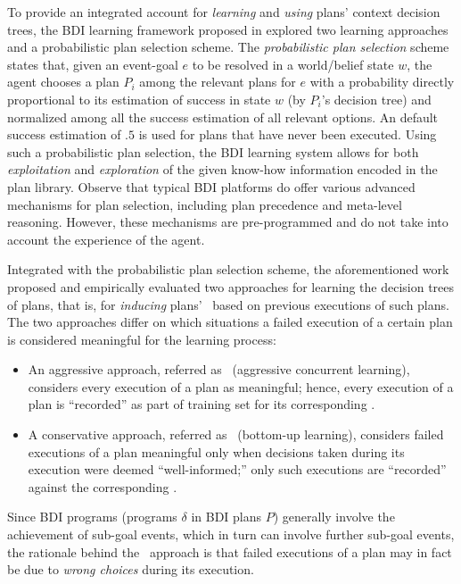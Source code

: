 To provide an integrated account for \emph{learning} and \emph{using} plans'
context decision trees, the BDI learning framework proposed in
\cite{Airiau:IJAT:09} explored two learning approaches and a probabilistic plan
selection scheme.
The \emph{probabilistic plan selection} scheme states that, given an event-goal
$e$ to be resolved in a world/belief state $w$, the agent chooses a plan $P_i$
among the relevant plans for $e$ with a probability directly proportional to its
estimation of success in state $w$ (by $P_i$'s decision tree) and normalized
among all the success estimation of all relevant options. An default success
estimation of $.5$ is used for plans that have never been executed.
Using such a probabilistic plan selection, the BDI learning system allows for both
\emph{exploitation} and \emph{exploration} of the given know-how information
encoded in the plan library.
Observe that typical BDI platforms do offer various advanced mechanisms for plan
selection, including plan precedence and meta-level reasoning. However, these
mechanisms are pre-programmed and do not take into account the experience of the
agent.

Integrated with the probabilistic plan selection scheme, the aforementioned work
proposed and empirically evaluated two approaches for learning the decision trees
of plans, that is, for \emph{inducing} plans' \dt\ based on previous executions
of such plans.
The two approaches differ on which situations a failed execution of a certain
plan is considered meaningful for the learning process:
\begin{itemize}
  
  \item An aggressive approach, referred as \CL\ (aggressive concurrent learning),
  considers every execution of a plan as meaningful; hence, every execution of
  a plan is ``recorded'' as part of training set for its corresponding \dt.

  
  \item A conservative approach, referred as \BUL\ (bottom-up learning),
  considers failed executions of a plan meaningful only when decisions taken
  during its execution were deemed ``well-informed;'' only such executions 
  are ``recorded'' against the corresponding \dt.
\end{itemize}


Since BDI programs (programs $\delta$ in BDI plans $P$) generally involve the
achievement of sub-goal events, which in turn can involve further sub-goal
events, the rationale behind the \BUL\ approach is that failed executions of a
plan may in fact be due to \emph{wrong choices} during its execution.




